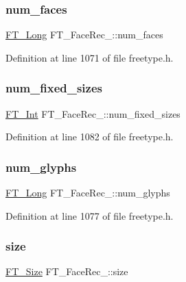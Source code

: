 \subsubsection{\texorpdfstring{num\_faces}{num\_faces}}
{\footnotesize\ttfamily \mbox{\hyperlink{fttypes_8h_a7fa72a1f0e79fb1860c5965789024d6f}{F\+T\+\_\+\+Long}} F\+T\+\_\+\+Face\+Rec\+\_\+\+::num\+\_\+faces}



Definition at line 1071 of file freetype.\+h.

\mbox{\label{struct_f_t___face_rec___aa652af958546eb8edf87ccd4b697bfdf}} 
\subsubsection{\texorpdfstring{num\_fixed\_sizes}{num\_fixed\_sizes}}
{\footnotesize\ttfamily \mbox{\hyperlink{fttypes_8h_af90e5fb0d07e21be9fe6faa33f02484c}{F\+T\+\_\+\+Int}} F\+T\+\_\+\+Face\+Rec\+\_\+\+::num\+\_\+fixed\+\_\+sizes}



Definition at line 1082 of file freetype.\+h.

\mbox{\label{struct_f_t___face_rec___a58348bc3e0e113e8c73de9c318a9bd7a}} 
\subsubsection{\texorpdfstring{num\_glyphs}{num\_glyphs}}
{\footnotesize\ttfamily \mbox{\hyperlink{fttypes_8h_a7fa72a1f0e79fb1860c5965789024d6f}{F\+T\+\_\+\+Long}} F\+T\+\_\+\+Face\+Rec\+\_\+\+::num\+\_\+glyphs}



Definition at line 1077 of file freetype.\+h.

\mbox{\label{struct_f_t___face_rec___a212d116864a5d81e80b176f9b846cd08}} 
\subsubsection{\texorpdfstring{size}{size}}
{\footnotesize\ttfamily \mbox{\hyperlink{freetype_8h_a791d0ff3273ca9628a523efd98d138c1}{F\+T\+\_\+\+Size}} F\+T\+\_\+\+Face\+Rec\+\_\+\+::size}



